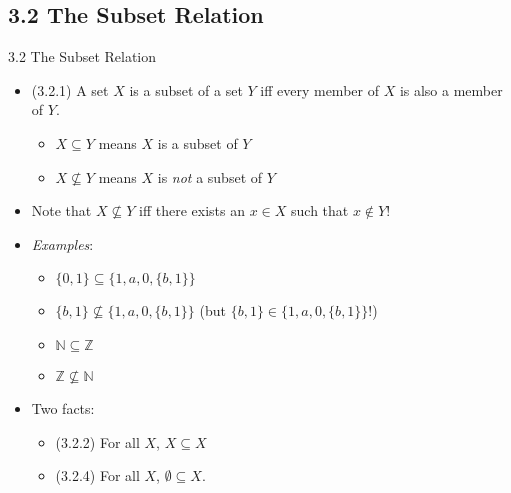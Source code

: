 \subsection{3.2 The Subset Relation}
\begin{frame}{3.2 The Subset Relation}
	
	\begin{itemize}
	
		\item (3.2.1) A set $X$ is a subset of a set $Y$ iff every member of $X$ is also a member of $Y$.
		
		\begin{itemize}
		
			\item $X\subseteq Y$ means $X$ is a subset of $Y$
			
			\item $X\nsubseteq Y$ means $X$ is \emph{not} a subset of $Y$
		
		\end{itemize}
		
		\item Note that $X\nsubseteq Y$ iff there exists an $x\in X$ such that $x\notin Y$!
		
		\item \emph{Examples}:
		
		\begin{itemize}
		
			\item $\{0,1\}\subseteq \{1,a,0,\{b,1\}\}$
			
			\item $\{b,1\}\nsubseteq \{1,a,0,\{b,1\}\}$ (but $\{b,1\}\in \{1,a,0,\{b,1\}\}$!)
			
			\item $\mathbb{N}\subseteq \mathbb{Z}$
			
			\item $\mathbb{Z}\nsubseteq \mathbb{N}$
		
		\end{itemize}
		
		\item Two facts:
		
			\begin{itemize}
			
				\item (3.2.2) For all $X$, $X\subseteq X$
				
				\item (3.2.4) For all $X$, $\emptyset\subseteq X$.
			
			\end{itemize}
	
	\end{itemize}

\end{frame}

